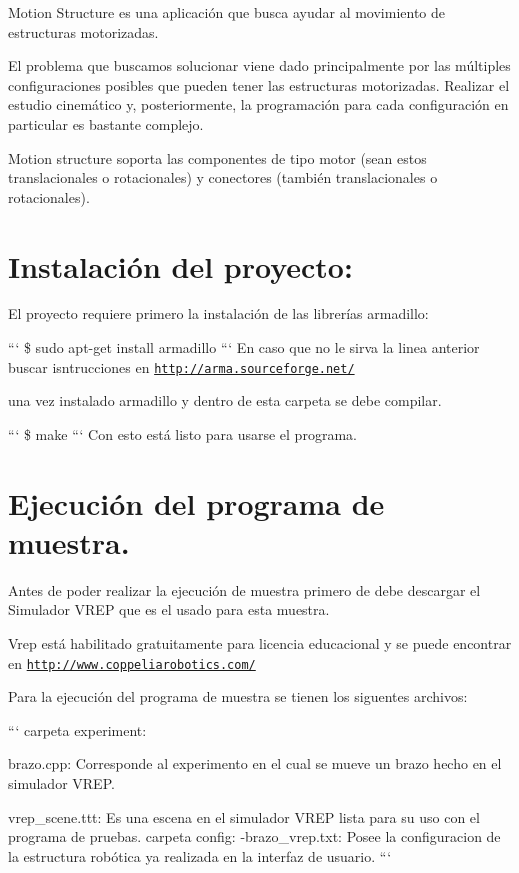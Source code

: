 Motion Structure es una aplicación que busca ayudar al movimiento de estructuras motorizadas.

El problema que buscamos solucionar viene dado principalmente por las múltiples configuraciones posibles que pueden tener las estructuras motorizadas. Realizar el estudio cinemático y, posteriormente, la programación para cada configuración en particular es bastante complejo.

Motion structure soporta las componentes de tipo motor (sean estos translacionales o rotacionales) y conectores (también translacionales o rotacionales).

\section*{Instalación del proyecto\-: }

El proyecto requiere primero la instalación de las librerías armadillo\-:

``` \$ sudo apt-\/get install armadillo ``` En caso que no le sirva la linea anterior buscar isntrucciones en \href{http://arma.sourceforge.net/}{\tt http\-://arma.\-sourceforge.\-net/}

una vez instalado armadillo y dentro de esta carpeta se debe compilar.

``` \$ make ``` Con esto está listo para usarse el programa.

\section*{Ejecución del programa de muestra. }

Antes de poder realizar la ejecución de muestra primero de debe descargar el Simulador V\-R\-E\-P que es el usado para esta muestra.

Vrep está habilitado gratuitamente para licencia educacional y se puede encontrar en \href{http://www.coppeliarobotics.com/}{\tt http\-://www.\-coppeliarobotics.\-com/}

Para la ejecución del programa de muestra se tienen los siguentes archivos\-:

``` carpeta experiment\-:
\begin{DoxyItemize}
\item brazo.\-cpp\-: Corresponde al experimento en el cual se mueve un brazo hecho en el simulador V\-R\-E\-P.
\item vrep\-\_\-scene.\-ttt\-: Es una escena en el simulador V\-R\-E\-P lista para su uso con el programa de pruebas. carpeta config\-: -\/brazo\-\_\-vrep.\-txt\-: Posee la configuracion de la estructura robótica ya realizada en la interfaz de usuario. ```
\end{DoxyItemize}

